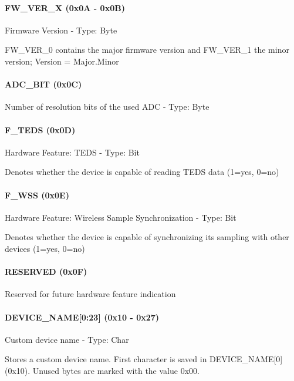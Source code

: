 \documentclass[11pt, a4paper]{article}
\begin{document}
\paragraph{FW\_VER\_X (0x0A - 0x0B)} Firmware Version - Type: Byte

FW\_VER\_0 contains the major firmware version and FW\_VER\_1 the minor version; Version = Major.Minor

\paragraph{ADC\_BIT (0x0C)} Number of resolution bits of the used ADC - Type: Byte

\paragraph{F\_TEDS (0x0D)} Hardware Feature: TEDS - Type: Bit

Denotes whether the device is capable of reading TEDS data (1=yes, 0=no)

\paragraph{F\_WSS (0x0E)} Hardware Feature: Wireless Sample Synchronization - Type: Bit

Denotes whether the device is capable of synchronizing its sampling with other devices (1=yes, 0=no)

\paragraph{RESERVED (0x0F)} Reserved for future hardware feature indication

\paragraph{DEVICE\_NAME[0:23] (0x10 - 0x27)} Custom device name - Type: Char

Stores a custom device name. First character is saved in DEVICE\_NAME[0] (0x10). Unused bytes are marked with the value 0x00.
\end{document}
